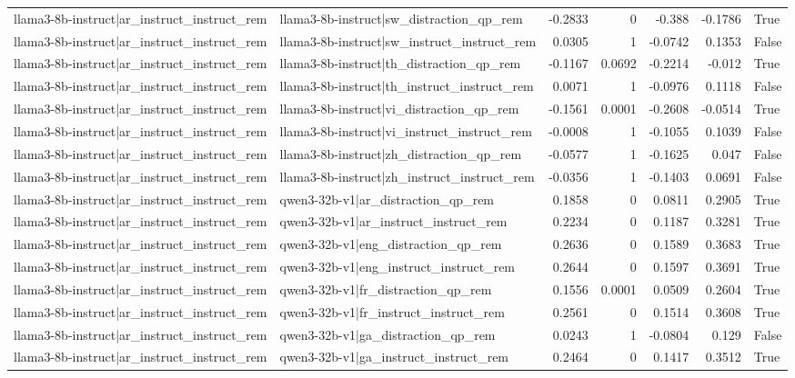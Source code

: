 \begin{table}
\begin{tabular}{l l r r r r l}
llama3-8b-instruct|ar_instruct_instruct_rem & llama3-8b-instruct|sw_distraction_qp_rem & -0.2833 & 0 & -0.388 & -0.1786 & True \\
llama3-8b-instruct|ar_instruct_instruct_rem & llama3-8b-instruct|sw_instruct_instruct_rem & 0.0305 & 1 & -0.0742 & 0.1353 & False \\
llama3-8b-instruct|ar_instruct_instruct_rem & llama3-8b-instruct|th_distraction_qp_rem & -0.1167 & 0.0692 & -0.2214 & -0.012 & True \\
llama3-8b-instruct|ar_instruct_instruct_rem & llama3-8b-instruct|th_instruct_instruct_rem & 0.0071 & 1 & -0.0976 & 0.1118 & False \\
llama3-8b-instruct|ar_instruct_instruct_rem & llama3-8b-instruct|vi_distraction_qp_rem & -0.1561 & 0.0001 & -0.2608 & -0.0514 & True \\
llama3-8b-instruct|ar_instruct_instruct_rem & llama3-8b-instruct|vi_instruct_instruct_rem & -0.0008 & 1 & -0.1055 & 0.1039 & False \\
llama3-8b-instruct|ar_instruct_instruct_rem & llama3-8b-instruct|zh_distraction_qp_rem & -0.0577 & 1 & -0.1625 & 0.047 & False \\
llama3-8b-instruct|ar_instruct_instruct_rem & llama3-8b-instruct|zh_instruct_instruct_rem & -0.0356 & 1 & -0.1403 & 0.0691 & False \\
llama3-8b-instruct|ar_instruct_instruct_rem & qwen3-32b-v1|ar_distraction_qp_rem & 0.1858 & 0 & 0.0811 & 0.2905 & True \\
llama3-8b-instruct|ar_instruct_instruct_rem & qwen3-32b-v1|ar_instruct_instruct_rem & 0.2234 & 0 & 0.1187 & 0.3281 & True \\
llama3-8b-instruct|ar_instruct_instruct_rem & qwen3-32b-v1|eng_distraction_qp_rem & 0.2636 & 0 & 0.1589 & 0.3683 & True \\
llama3-8b-instruct|ar_instruct_instruct_rem & qwen3-32b-v1|eng_instruct_instruct_rem & 0.2644 & 0 & 0.1597 & 0.3691 & True \\
llama3-8b-instruct|ar_instruct_instruct_rem & qwen3-32b-v1|fr_distraction_qp_rem & 0.1556 & 0.0001 & 0.0509 & 0.2604 & True \\
llama3-8b-instruct|ar_instruct_instruct_rem & qwen3-32b-v1|fr_instruct_instruct_rem & 0.2561 & 0 & 0.1514 & 0.3608 & True \\
llama3-8b-instruct|ar_instruct_instruct_rem & qwen3-32b-v1|ga_distraction_qp_rem & 0.0243 & 1 & -0.0804 & 0.129 & False \\
llama3-8b-instruct|ar_instruct_instruct_rem & qwen3-32b-v1|ga_instruct_instruct_rem & 0.2464 & 0 & 0.1417 & 0.3512 & True \\

\end{tabular}
\end{table}
